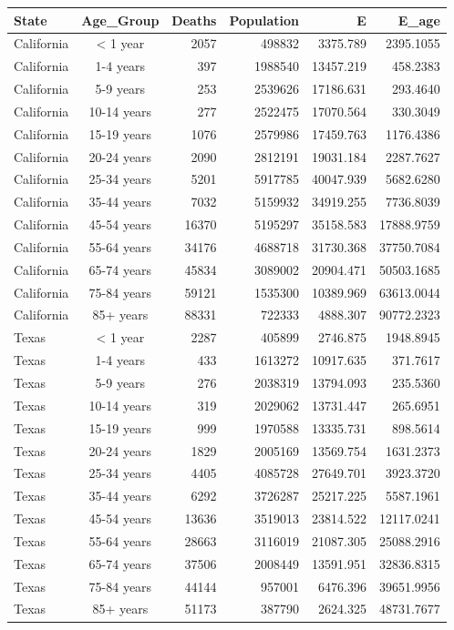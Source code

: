 \documentclass[
  letterpaper,
  DIV=11,
  numbers=noendperiod]{scrreprt}
\begin{document}
\begin{longtable*}{lcrrrr}
\toprule
State & Age\_Group & Deaths & Population & E & E\_age \\ 
\midrule
California & < 1 year & 2057 & 498832 & 3375.789 & 2395.1055 \\ 
California & 1-4 years & 397 & 1988540 & 13457.219 & 458.2383 \\ 
California & 5-9 years & 253 & 2539626 & 17186.631 & 293.4640 \\ 
California & 10-14 years & 277 & 2522475 & 17070.564 & 330.3049 \\ 
California & 15-19 years & 1076 & 2579986 & 17459.763 & 1176.4386 \\ 
California & 20-24 years & 2090 & 2812191 & 19031.184 & 2287.7627 \\ 
California & 25-34 years & 5201 & 5917785 & 40047.939 & 5682.6280 \\ 
California & 35-44 years & 7032 & 5159932 & 34919.255 & 7736.8039 \\ 
California & 45-54 years & 16370 & 5195297 & 35158.583 & 17888.9759 \\ 
California & 55-64 years & 34176 & 4688718 & 31730.368 & 37750.7084 \\ 
California & 65-74 years & 45834 & 3089002 & 20904.471 & 50503.1685 \\ 
California & 75-84 years & 59121 & 1535300 & 10389.969 & 63613.0044 \\ 
California & 85+ years & 88331 & 722333 & 4888.307 & 90772.2323 \\ 
Texas & < 1 year & 2287 & 405899 & 2746.875 & 1948.8945 \\ 
Texas & 1-4 years & 433 & 1613272 & 10917.635 & 371.7617 \\ 
Texas & 5-9 years & 276 & 2038319 & 13794.093 & 235.5360 \\ 
Texas & 10-14 years & 319 & 2029062 & 13731.447 & 265.6951 \\ 
Texas & 15-19 years & 999 & 1970588 & 13335.731 & 898.5614 \\ 
Texas & 20-24 years & 1829 & 2005169 & 13569.754 & 1631.2373 \\ 
Texas & 25-34 years & 4405 & 4085728 & 27649.701 & 3923.3720 \\ 
Texas & 35-44 years & 6292 & 3726287 & 25217.225 & 5587.1961 \\ 
Texas & 45-54 years & 13636 & 3519013 & 23814.522 & 12117.0241 \\ 
Texas & 55-64 years & 28663 & 3116019 & 21087.305 & 25088.2916 \\ 
Texas & 65-74 years & 37506 & 2008449 & 13591.951 & 32836.8315 \\ 
Texas & 75-84 years & 44144 & 957001 & 6476.396 & 39651.9956 \\ 
Texas & 85+ years & 51173 & 387790 & 2624.325 & 48731.7677 \\ 
\bottomrule
\end{longtable*}
\end{document}
